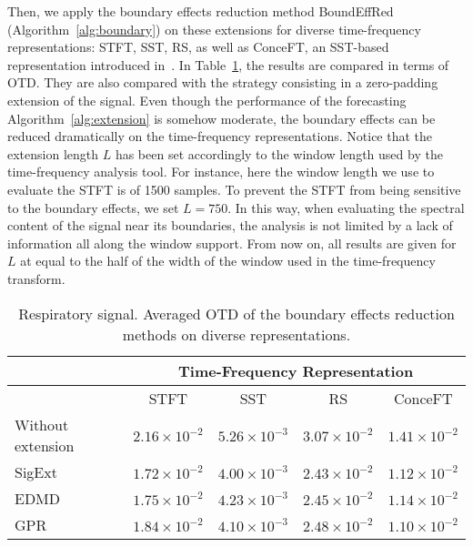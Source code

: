 Then, we apply the boundary effects reduction method {\sf BoundEffRed} (Algorithm~\ref{alg:boundary}) on these extensions for diverse time-frequency representations: STFT, SST, RS, as well as ConceFT, an SST-based representation introduced in~\cite{Daubechies16conceft}. In Table~\ref{tab:otd.tho}, the results are compared in terms of OTD. They are also compared with the strategy consisting in a zero-padding extension of the signal. Even though the performance of the forecasting Algorithm~\ref{alg:extension} is somehow moderate, the boundary effects can be reduced dramatically on the time-frequency representations. Notice that the extension length $L$ has been set accordingly to the window length used by the time-frequency analysis tool. For instance, here the window length we use to evaluate the STFT is of 1500 samples. To prevent the STFT from being sensitive to the boundary effects, we set $L=750$. In this way, when evaluating the spectral content of the signal near its boundaries, the analysis is not limited by a lack of information all along the window support. From now on, all results are given for $L$ at equal to the half of the width of the window used in the time-frequency transform.  

\begin{table}
\centering
\caption{Respiratory signal. Averaged OTD of the boundary effects reduction methods on diverse representations.}
\begin{tabular}{|>{\centering}m{35pt}||c|c|c|c|}
  \hline
   \multirow{2}{35pt}{\centering Extension method} & \multicolumn{4}{c|}{Time-Frequency Representation} \\
   \cline{2-5}
      & STFT & SST & RS & ConceFT \\
   \hhline{|=#=|=|=|=|}
   Without extension & $2.16\!\times\! 10^{-2}$ & $5.26\!\times\! 10^{-3}$ & $3.07\!\times\! 10^{-2}$ & $1.41\!\times\! 10^{-2}$ \\
   \hline
   {\sf SigExt} & $1.72\!\times\! 10^{-2}$ & $4.00\!\times\! 10^{-3}$ & $2.43\!\times\! 10^{-2}$ & $1.12\!\times\! 10^{-2}$ \\
   \hline
   EDMD & $1.75\!\times\! 10^{-2}$ & $4.23\!\times\! 10^{-3}$ & $2.45\!\times\! 10^{-2}$ & $1.14\!\times\! 10^{-2}$ \\
   \hline
   GPR & $1.84\!\times\! 10^{-2}$ & $4.10\!\times\! 10^{-3}$ & $2.48\!\times\! 10^{-2}$ & $1.10\!\times\! 10^{-2}$ \\
   \hline
\end{tabular}
\label{tab:otd.tho}
\end{table}


